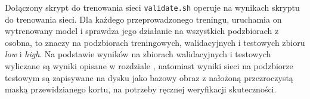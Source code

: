 Dołączony skrypt do trenowania sieci \texttt{validate.sh} operuje na wynikach skryptu do trenowania sieci. Dla każdego przeprowadzonego treningu, uruchamia on wytrenowany model i sprawdza jego działanie na wszystkich podzbiorach z osobna, to znaczy na podzbiorach treningowych, walidacyjnych i testowych zbioru \textit{low} i \textit{high}. Na podstawie wyników na zbiorach walidacyjnych i testowych wyliczane są wyniki opisane w rozdziale , natomiast wyniki sieci na podzbiorze testowym są zapisywane na dysku jako bazowy obraz z nałożoną przezroczystą maską przewidzianego kortu, na potrzeby ręcznej weryfikacji skuteczności.
